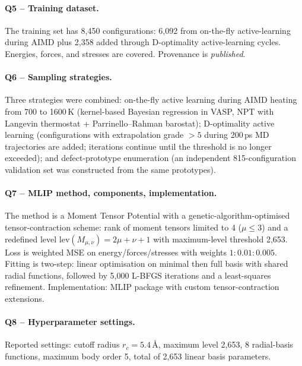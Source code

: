 \paragraph{Q5 -- Training dataset.}
The training set has 8{,}450 configurations: 6{,}092 from on-the-fly
active-learning during AIMD plus 2{,}358 added through D-optimality
active-learning cycles. Energies, forces, and stresses are covered.
Provenance is \emph{published}.


\paragraph{Q6 -- Sampling strategies.}
Three strategies were combined: on-the-fly active learning during
AIMD heating from 700 to 1600\,K (kernel-based Bayesian regression in
VASP, NPT with Langevin thermostat + Parrinello--Rahman barostat);
D-optimality active learning (configurations with extrapolation
grade $>5$ during 200\,ps MD trajectories are added; iterations
continue until the threshold is no longer exceeded); and
defect-prototype enumeration (an independent 815-configuration
validation set was constructed from the same prototypes).


\paragraph{Q7 -- MLIP method, components, implementation.}
The method is a Moment Tensor Potential with a
genetic-algorithm-optimised tensor-contraction scheme: rank of moment
tensors limited to 4 ($\mu \le 3$) and a redefined level
$\text{lev}(M_{\mu,\nu}) = 2\mu + \nu + 1$ with maximum-level
threshold 2{,}653. Loss is weighted MSE on energy/forces/stresses
with weights $1{:}0.01{:}0.005$. Fitting is two-step: linear
optimisation on minimal then full basis with shared radial functions,
followed by 5{,}000 L-BFGS iterations and a least-squares
refinement. Implementation: MLIP package with custom
tensor-contraction extensions.


\paragraph{Q8 -- Hyperparameter settings.}
Reported settings: cutoff radius $r_c=5.4$\,\AA, maximum level
2{,}653, 8 radial-basis functions, maximum body order 5, total of
2{,}653 linear basis parameters.



